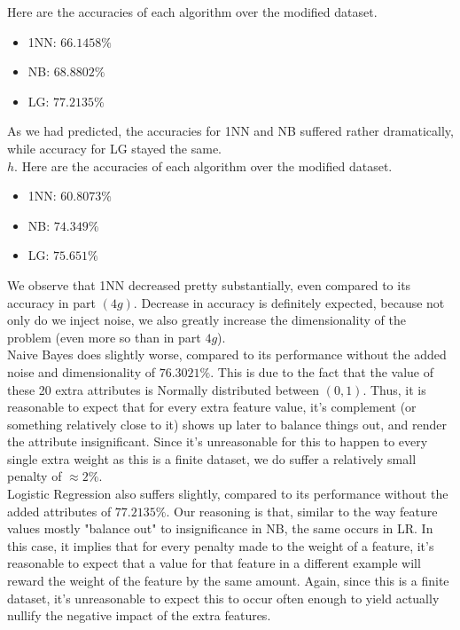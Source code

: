 \documentclass[11pt]{article}
\begin{document}
\noindent Here are the accuracies of each algorithm over the modified dataset.
\begin{itemize}
\item 1NN: $66.1458\%$
\item NB: $68.8802\%$
\item LG: $77.2135\%$
\end{itemize}
As we had predicted, the accuracies for 1NN and NB suffered rather dramatically, while accuracy for LG stayed the same.\\

\noindent $h.$ Here are the accuracies of each algorithm over the modified dataset.
\begin{itemize}
\item 1NN: $60.8073\%$
\item NB: $74.349\%$
\item LG: $75.651\%$
\end{itemize}

\noindent We observe that 1NN decreased pretty substantially, even compared to its accuracy in part $(4g)$. Decrease in accuracy is definitely expected, because not only do we inject noise, we also greatly increase the dimensionality of the problem (even more so than in part $4g$).\\

\noindent Naive Bayes does slightly worse, compared to its performance without the added noise and dimensionality of $76.3021\%$. This is due to the fact that the value of these 20 extra attributes is Normally distributed between $(0, 1)$. Thus, it is reasonable to expect that for every extra feature value, it's complement (or something relatively close to it) shows up later to balance things out, and render the attribute insignificant. Since it's unreasonable for this to happen to every single extra weight as this is a finite dataset, we do suffer a relatively small penalty of $\approx 2\%$.\\

\noindent Logistic Regression also suffers slightly, compared to its performance without the added attributes of $77.2135\%$. Our reasoning is that, similar to the way feature values mostly "balance out" to insignificance in NB, the same occurs in LR. In this case, it implies that for every penalty made to the weight of a feature, it's reasonable to expect that a value for that feature in a different example will reward the weight of the feature by the same amount. Again, since this is a finite dataset, it's unreasonable to expect this to occur often enough to yield actually nullify the negative impact of the extra features.
\end{document}
